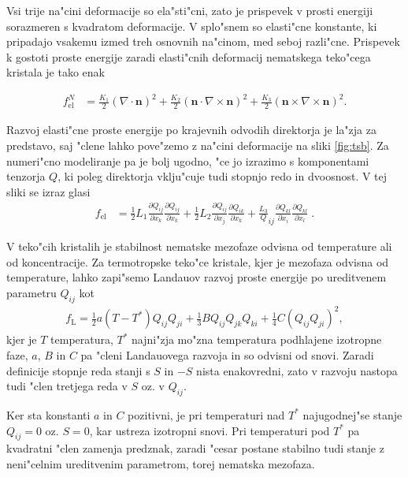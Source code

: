 \documentclass[12pt,twoside,openright,final]{report}
\renewcommand{\vec}{\mathbf}
\newcommand{\qodv}[2]{\ensuremath{\frac{\partial Q_{#1}}{\partial x_{#2}}}}
\begin{document}
Vsi trije na"cini deformacije so ela"sti"cni, zato je prispevek v prosti energiji sorazmeren s kvadratom deformacije. 
V splo"snem so elasti"cne konstante, ki pripadajo vsakemu izmed treh osnovnih na"cinom, med seboj razli"cne. 
Prispevek k gostoti proste energije zaradi elasti"cnih deformacij nematskega teko"cega kristala je tako enak

\begin{align}
 f_{\mathrm{el}}^N &= \frac{K_1}{2} (\nabla \cdot \vec n)^2 + \frac{K_2}{2} (\vec n \cdot \nabla \times \vec n)^2 + \frac{K_3}{2} (\vec n \times \nabla \times \vec n)^2. 
\end{align}

Razvoj elasti"cne proste energije po krajevnih odvodih direktorja je la"zja za predstavo, saj "clene lahko pove"zemo z na"cini deformacije na sliki \ref{fig:tsb}. 
Za numeri"cno modeliranje pa je bolj ugodno, "ce jo izrazimo s komponentami tenzorja $Q$, ki poleg direktorja vklju"cuje tudi stopnjo redo in dvoosnost\cite{copar-phd}. 
V tej sliki se izraz glasi
\begin{align}
 f_{\mathrm{el}} &= \frac{1}{2}L_1\qodv{ij}{k}\qodv{ij}{k} + \frac{1}{2}L_2 \qodv{ij}{j}\qodv{ik}{k} + \frac{L_3}Q_{ij}\qodv{kl}{i}\qodv{kl}{l}\;.
\end{align}

V teko"cih kristalih je stabilnost nematske mezofaze odvisna od temperature ali od koncentracije. 
Za termotropske teko"ce kristale, kjer je mezofaza odvisna od temperature, lahko zapi"semo Landauov razvoj proste energije po ureditvenem parametru $Q_{ij}$ kot
\begin{align}
  f_{\mathrm{L}} = \frac{1}{2}a(T-T^*)Q_{ij}Q_{ji} + \frac{1}{3}BQ_{ij}Q_{jk}Q_{ki} + \frac{1}{4}C(Q_{ij}Q_{ji})^2,
\end{align}
kjer je $T$ temperatura, $T^*$ najni"zja mo"zna temperatura podhlajene izotropne faze, $a$, $B$ in $C$ pa "cleni Landauovega razvoja in so odvisni od snovi. 
Zaradi definicije stopnje reda stanji s $S$ in $-S$ nista enakovredni, zato v razvoju nastopa tudi "clen tretjega reda v $S$ oz. v $Q_{ij}$. 

Ker sta konstanti $a$ in $C$ pozitivni, je pri temperaturi nad $T^*$ najugodnej"se stanje $Q_{ij}=0$ oz. $S=0$, kar ustreza izotropni snovi. 
Pri temperaturi pod $T^*$ pa kvadratni "clen zamenja predznak, zaradi "cesar postane stabilno tudi stanje z neni"celnim ureditvenim parametrom, torej nematska mezofaza. 
\end{document}

